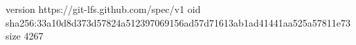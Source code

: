 version https://git-lfs.github.com/spec/v1
oid sha256:33a10d8d373d57824a512397069156ad57d71613ab1ad41441aa525a57811e73
size 4267
